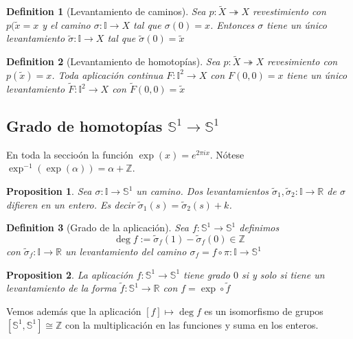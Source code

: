 \documentclass{myclass}
\newtheorem*{definition}{Definition}
\newtheorem*{proposition}{Proposition}
\begin{document}
\begin{definition}[Levantamiento de caminos] Sea $p:\tilde{X} \twoheadrightarrow X$ revestimiento con $p(\tilde{x}=x$ y el camino $\sigma : \mathbb{I} \to X$ tal que $\sigma (0) = x$. Entonces $\sigma $ tiene un único levantamiento $\tilde{\sigma }: \mathbb{I} \to  X$ tal que  $\tilde{\sigma}(0) = \tilde{x}$
\end{definition}

\begin{definition}[Levantamiento de homotopías] Sea $p:\tilde{X} \twoheadrightarrow X$ revesimiento con $p(\tilde{x})=x$. Toda aplicación continua $F:\mathbb{I}^2 \to X$ con $F(0, 0) = x$ tiene un único levantamiento  $\tilde{F}: \mathbb{I}^2 \to  X$ con $\tilde{F}(0, 0) = \tilde{x}$
\end{definition}

\subsection{Grado de homotopías $\mathbb{S}^1 \to \mathbb{S}^1$}
En toda la seccioón la función $\exp(x) = e^{2\pi i x}$. Nótese $\exp^{-1}(\exp(\alpha )) = \alpha + \mathbb{Z}$.

\begin{proposition}
Sea $\sigma : \mathbb{I} \to \mathbb{S}^1$ un camino. Dos levantamientos $\tilde{\sigma }_1, \tilde{\sigma }_2: \mathbb{I} \to  \mathbb{R}$ de $\sigma $ difieren en un entero. Es decir $\tilde{\sigma }_1(s) = \tilde{\sigma }_2(s) + k$.
\end{proposition}

\begin{definition}[Grado de la aplicación] Sea $f:\mathbb{S}^1 \to  \mathbb{S}^1$ definimos
  \[
  \deg f:= \tilde{\sigma }_f(1) - \tilde{\sigma }_f(0) \in \mathbb{Z}
  \] 
  con $\tilde{\sigma }_f:\mathbb{I} \to  \mathbb{R}$ un levantamiento del camino $\sigma _f = f \circ \pi : \mathbb{I} \to  \mathbb{S}^1$
\end{definition}

\begin{proposition}
La aplicación $f:  \mathbb{S}^1 \to  \mathbb{S}^1 $ tiene grado $0$ si y solo si tiene un levantamiento de la forma $\tilde{f}: \mathbb{S}^1 \to  \mathbb{R}$ con $f=\exp \circ \tilde{f}$
\end{proposition}

Vemos además que la aplicación $[f] \mapsto \deg f$ es un isomorfismo de grupos $[\mathbb{S}^1, \mathbb{S}^1] \cong \mathbb{Z}$ con la multiplicación en las funciones y suma en los enteros.
\end{document}
